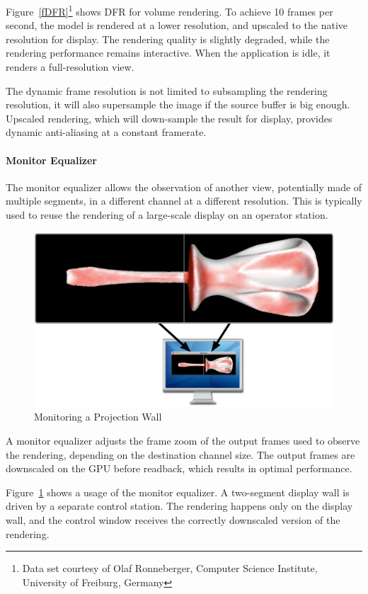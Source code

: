 \documentclass[10pt,a4]{scrartcl}
\newcommand{\fig}[1]{Figure~\ref{#1}}
\begin{document}
\fig{fDFR}\footnote{Data set courtesy of Olaf Ronneberger, Computer
  Science Institute, University of Freiburg, Germany} shows DFR for
volume rendering. To achieve 10 frames per second, the model is rendered
at a lower resolution, and upscaled to the native resolution for
display. The rendering quality is slightly degraded, while the rendering
performance remains interactive. When the application is idle, it
renders a full-resolution view.

The dynamic frame resolution is not limited to subsampling the rendering
resolution, it will also supersample the image if the source buffer is big
enough. Upscaled rendering, which will down-sample the result for display,
provides dynamic anti-aliasing at a constant framerate.

\paragraph{Monitor Equalizer}
The monitor equalizer allows the observation of another view,
potentially made of multiple segments, in a different channel at a
different resolution. This is typically used to reuse the rendering of
a large-scale display on an operator station.

\begin{figure}
  \includegraphics[width=.618\textwidth]{images/monitorEq.pdf}
  {\caption{\label{fMonitorEq}Monitoring a Projection Wall}}
\end{figure}
A monitor equalizer adjusts the frame zoom of the output frames used to
observe the rendering, depending on the destination channel size. The
output frames are downscaled on the GPU before readback, which results
in optimal performance.

\fig{fMonitorEq} shows a usage of the monitor equalizer. A two-segment
display wall is driven by a separate control station. The rendering
happens only on the display wall, and the control window receives the
correctly downscaled version of the rendering.
\end{document}
